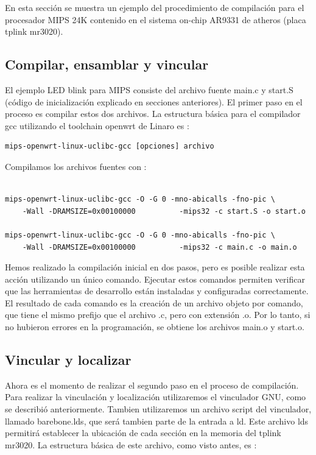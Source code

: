 \documentclass[output=paper, 
colorlinks,
citecolor=brown,
newtxmath
]{langscibook}
\begin{document}
En esta sección se muestra un ejemplo del procedimiento de compilación 
para el procesador MIPS 24K contenido en el sistema on-chip AR9331 de atheros
(placa tplink mr3020).

\subsection {Compilar, ensamblar y vincular}

El ejemplo LED blink para MIPS consiste del archivo fuente main.c y start.S
(código de inicialización explicado en secciones anteriores).
El primer paso en el proceso es compilar estos dos archivos.
La estructura básica para el compilador gcc utilizando el toolchain openwrt
de Linaro es :

\begin{verbatim}
mips-openwrt-linux-uclibc-gcc [opciones] archivo
\end{verbatim}

Compilamos los archivos fuentes con :

\begin{verbatim}

mips-openwrt-linux-uclibc-gcc -O -G 0 -mno-abicalls -fno-pic \
    -Wall -DRAMSIZE=0x00100000          -mips32 -c start.S -o start.o

mips-openwrt-linux-uclibc-gcc -O -G 0 -mno-abicalls -fno-pic \
    -Wall -DRAMSIZE=0x00100000          -mips32 -c main.c -o main.o

\end{verbatim}

Hemos realizado la compilación inicial en dos pasos, pero es posible realizar
esta acción utilizando un único comando. Ejecutar estos comandos 
permiten verificar que las herramientas de desarrollo
están instaladas y configuradas correctamente. El resultado 
de cada comando es la creación de un archivo objeto por comando, que tiene
el mismo prefijo que el archivo .c, pero con extensión .o.
Por lo tanto, si no hubieron errores en la programación, se obtiene
los archivos main.o y start.o.

\subsection {Vincular y localizar}

Ahora es el momento de realizar el segundo paso en el proceso de compilación.
Para realizar la vinculación y localización utilizaremos el vinculador GNU,
como se describió anteriormente. Tambien
utilizaremos un archivo script del vinculador, llamado
barebone.lds, que será tambien parte de la entrada a ld. Este archivo lds
permitirá establecer la ubicación de cada sección en la memoria del tplink
mr3020.  La estructura básica de este archivo, como visto antes, es :
\end{document}
